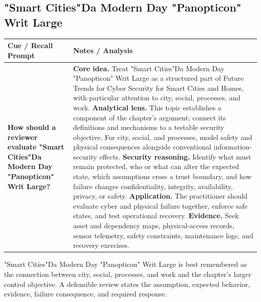 \documentclass[11pt]{article}
\newcommand{\CornellHeader}{%
\rowcolor{Navy}\color{white}\bfseries Cue / Recall Prompt & \color{white}\bfseries Notes / Analysis\\\hline}
\newcommand{\CornellRow}[2]{%
\cellcolor{CueGray}\RaggedRight\textbf{#1} & \RaggedRight #2\\\hline}
\begin{document}
\subsection*{"Smart Cities"Da Modern Day "Panopticon" Writ Large}
\begin{longtable}{>{\RaggedRight\arraybackslash}p{}|>{\RaggedRight\arraybackslash}p{}}
\CornellHeader
\CornellRow{How should a reviewer evaluate "Smart Cities"Da Modern Day "Panopticon" Writ Large?}{\textbf{Core idea.} Treat "Smart Cities"Da Modern Day "Panopticon" Writ Large as a structured part of Future Trends for Cyber Security for Smart Cities and Homes, with particular attention to city, social, processes, and work. \textbf{Analytical lens.} This topic establishes a component of the chapter's argument; connect its definitions and mechanisms to a testable security objective. For city, social, and processes, model safety and physical consequences alongside conventional information-security effects. \textbf{Security reasoning.} Identify what must remain protected, who or what can alter the expected state, which assumptions cross a trust boundary, and how failure changes confidentiality, integrity, availability, privacy, or safety. \textbf{Application.} The practitioner should evaluate cyber and physical failure together, enforce safe states, and test operational recovery. \textbf{Evidence.} Seek asset and dependency maps, physical-access records, sensor telemetry, safety constraints, maintenance logs, and recovery exercises.}
\end{longtable}
\begin{topicsummary}
"Smart Cities"Da Modern Day "Panopticon" Writ Large is best remembered as the connection between city, social, processes, and work and the chapter's larger control objective. A defensible review states the assumption, expected behavior, evidence, failure consequence, and required response.
\end{topicsummary}
\end{document}
